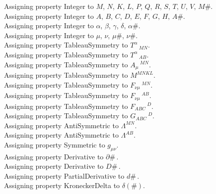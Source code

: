 \documentclass[11pt]{article}
\begin{document}
Assigning property Integer to $M$, $N$, $K$, $L$, $P$, $Q$, $R$, $S$, $T$, $U$, $V$, $M\#$.
\\
Assigning property Integer to $A$, $B$, $C$, $D$, $E$, $F$, $G$, $H$, $A\#$.
\\
Assigning property Integer to $\alpha$, $\beta$, $\gamma$, $\delta$, $\alpha\#$.
\\
Assigning property Integer to $\mu$, $\nu$, $\mu\#$, $\nu\#$.
\\
Assigning property TableauSymmetry to ${T}^{\alpha}\,_{M N}$.
\\
Assigning property TableauSymmetry to ${T}^{\alpha}\,_{A B}$.
\\
Assigning property TableauSymmetry to ${A}_{\mu}\,^{M N}$.
\\
Assigning property TableauSymmetry to ${M}^{M N K L}$.
\\
Assigning property TableauSymmetry to ${F}_{\nu \mu}\,^{M N}$.
\\
Assigning property TableauSymmetry to ${F}_{\nu \mu}\,^{A B}$.
\\
Assigning property TableauSymmetry to ${F}_{A B C}\,^{D}$.
\\
Assigning property TableauSymmetry to ${G}_{A B C}\,^{D}$.
\\
Assigning property AntiSymmetric to ${\Lambda}^{M N}$.
\\
Assigning property AntiSymmetric to ${\Lambda}^{A B}$.
\\
Assigning property Symmetric to ${g}_{\mu \nu}$.
\\
Assigning property Derivative to $\partial{\#}\, $.
\\
Assigning property Derivative to $D{\#}\, $.
\\
Assigning property PartialDerivative to $d{\#}\, $.
\\
Assigning property KroneckerDelta to $\delta(\#)$.
\end{document}
